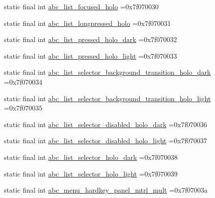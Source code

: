 \begin{DoxyCompactItemize}
\item 
static final int \mbox{\hyperlink{classcom_1_1example_1_1trainawearapplication_1_1_r_1_1drawable_a733fbf605d32228f07d6b818026e4459}{abc\+\_\+list\+\_\+focused\+\_\+holo}} =0x7f070030
\item 
static final int \mbox{\hyperlink{classcom_1_1example_1_1trainawearapplication_1_1_r_1_1drawable_abd0cf5f9a110f3c3d0a63b63905c7024}{abc\+\_\+list\+\_\+longpressed\+\_\+holo}} =0x7f070031
\item 
static final int \mbox{\hyperlink{classcom_1_1example_1_1trainawearapplication_1_1_r_1_1drawable_ad16cbe65223ba5934e5d41bdfa20b85f}{abc\+\_\+list\+\_\+pressed\+\_\+holo\+\_\+dark}} =0x7f070032
\item 
static final int \mbox{\hyperlink{classcom_1_1example_1_1trainawearapplication_1_1_r_1_1drawable_a677bfe48f13ac48eb10bbaf24a7d9829}{abc\+\_\+list\+\_\+pressed\+\_\+holo\+\_\+light}} =0x7f070033
\item 
static final int \mbox{\hyperlink{classcom_1_1example_1_1trainawearapplication_1_1_r_1_1drawable_a5e559cb649390abe4379ff7bad93de48}{abc\+\_\+list\+\_\+selector\+\_\+background\+\_\+transition\+\_\+holo\+\_\+dark}} =0x7f070034
\item 
static final int \mbox{\hyperlink{classcom_1_1example_1_1trainawearapplication_1_1_r_1_1drawable_ae68707a436c44d799f0427f276200dd9}{abc\+\_\+list\+\_\+selector\+\_\+background\+\_\+transition\+\_\+holo\+\_\+light}} =0x7f070035
\item 
static final int \mbox{\hyperlink{classcom_1_1example_1_1trainawearapplication_1_1_r_1_1drawable_a46894a6a54b32d3dbdc762bff805a782}{abc\+\_\+list\+\_\+selector\+\_\+disabled\+\_\+holo\+\_\+dark}} =0x7f070036
\item 
static final int \mbox{\hyperlink{classcom_1_1example_1_1trainawearapplication_1_1_r_1_1drawable_aa09fd1534770dea842ec6162aa7ef58a}{abc\+\_\+list\+\_\+selector\+\_\+disabled\+\_\+holo\+\_\+light}} =0x7f070037
\item 
static final int \mbox{\hyperlink{classcom_1_1example_1_1trainawearapplication_1_1_r_1_1drawable_ab3afd99e7e65a2f47275f76766f0d5d2}{abc\+\_\+list\+\_\+selector\+\_\+holo\+\_\+dark}} =0x7f070038
\item 
static final int \mbox{\hyperlink{classcom_1_1example_1_1trainawearapplication_1_1_r_1_1drawable_aeb9dd3c2c0ee829d50f97f4787ad32f6}{abc\+\_\+list\+\_\+selector\+\_\+holo\+\_\+light}} =0x7f070039
\item 
static final int \mbox{\hyperlink{classcom_1_1example_1_1trainawearapplication_1_1_r_1_1drawable_ae1e9b5546f2743bb285a2fa26b6b3125}{abc\+\_\+menu\+\_\+hardkey\+\_\+panel\+\_\+mtrl\+\_\+mult}} =0x7f07003a

\end{DoxyCompactItemize}

